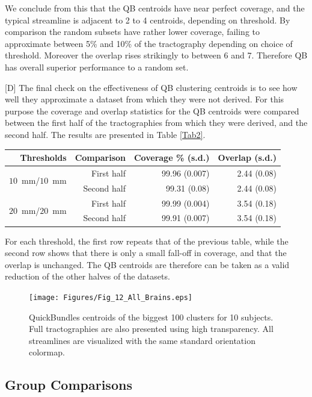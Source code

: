 \documentclass{bioinfo}
\begin{document}
We conclude from this that the QB centroids have near perfect coverage,
and the typical streamline is adjacent to 2 to 4 centroids,
depending on threshold. By comparison the random subsets have rather
lower coverage, failing to approximate between 5\% and 10\% of the
tractography depending on choice of threshold. Moreover the overlap
rises strikingly to between 6 and 7. Therefore QB has overall superior
performance to a random set.

[D] The final check on the effectiveness of QB clustering centroids is
to see how well they approximate a dataset from which they were not
derived.  For this purpose the coverage and overlap statistics for the
QB centroids were compared between the first half of the tractographies
from which they were derived, and the second half. The results are
presented in Table \ref{Tab2}.

\begin{table}[th]
{\begin{tabular}{rrrr}
Thresholds & Comparison & Coverage \% (s.d.) & Overlap (s.d.) \\
\hline
\multirow{2}{*}{$10$~mm/$10$~mm} & First half & 99.96 (0.007) & 2.44 (0.08)\\   
& Second half & 99.31 (0.08) & 2.44 (0.08)\\   
\hline
\multirow{2}{*}{$20$~mm/$20$~mm} & First half & 99.99 (0.004) & 3.54 (0.18)\\   
& Second half & 99.91 (0.007) & 3.54 (0.18)\\
\hline   
\end{tabular}}{}
\end{table}

For each threshold, the first row repeats that of the previous table,
while the second row shows that there is only a small fall-off in
coverage, and that the overlap is unchanged. The QB centroids are
therefore can be taken as a valid reduction of the other halves of the
datasets.

\begin{figure}[htp]
  \centerline{\texttt{[image: Figures/Fig\_12\_All\_Brains.eps]}}
  \caption{QuickBundles centroids of the biggest 100 clusters for 10
    subjects. Full tractographies are also presented using high
    transparency. All streamlines are visualized with the same standard
    orientation colormap. \label{Flo:BAs}}
\end{figure}


\subsection{Group Comparisons \label{sub:group_comp}}
\end{document}

